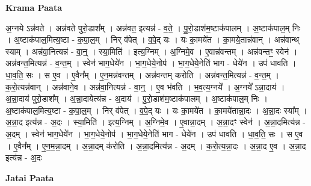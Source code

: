 \documentclass[17pt]{extarticle}
\begin{document}
\textbf{Krama Paata} \newline

अ॒ग्नये ऽन्न॑वते । अन्न॑वते पुरो॒डाश᳚म् । अन्न॑वत॒ इत्यन्न॑ - व॒ते॒ । पु॒रो॒डाश॑म॒ष्टाक॑पालम् । अ॒ष्टाक॑पाल॒म् निः । अ॒ष्टाक॑पाल॒मित्य॒ष्टा - क॒पा॒ल॒म् । निर् व॑पेत् । व॒पे॒द् यः । यः का॒मये॑त । का॒मये॒तान्न॑वान् । अन्न॑वान्थ् स्याम् । अन्न॑वा॒नित्यन्न॑ - वा॒न्॒ । स्या॒मिति॑ । इत्य॒ग्निम् । अ॒ग्निमे॒व । ए॒वान्न॑वन्तम् । अन्न॑वन्तꣳ॒॒ स्वेन॑ । अन्न॑वन्त॒मित्यन्न॑ - व॒न्त॒म् । स्वेन॑ भाग॒धेये॑न । भा॒ग॒धेये॒नोप॑ । भा॒ग॒धेये॒नेति॑ भाग - धेये॑न । उप॑ धावति । धा॒व॒ति॒ सः । स ए॒व । ए॒वैन᳚म् । ए॒न॒मन्न॑वन्तम् । अन्न॑वन्तम् करोति । अन्न॑वन्त॒मित्यन्न॑ - व॒न्त॒म् । क॒रो॒त्यन्न॑वान् । अन्न॑वाने॒व । अन्न॑वा॒नित्यन्न॑ - वा॒न्॒ । ए॒व भ॑वति । भ॒व॒त्य॒ग्नये᳚ । अ॒ग्नये᳚ ऽन्ना॒दाय॑ । अ॒न्ना॒दाय॑ पुरो॒डाश᳚म् । अ॒न्ना॒दायेत्य॑न्न - अ॒दाय॑ । पु॒रो॒डाश॑म॒ष्टाक॑पालम् । अ॒ष्टाक॑पाल॒म् निः । अ॒ष्टाक॑पाल॒मित्य॒ष्टा - क॒पा॒ल॒म् । निर् व॑पेत् । व॒पे॒द् यः । यः का॒मये॑त । का॒मये॑तान्ना॒दः । अ॒न्ना॒दः स्या᳚म् । अ॒न्ना॒द इत्य॑न्न - अ॒दः । स्या॒मिति॑ । इत्य॒ग्निम् । अ॒ग्निमे॒व । ए॒वान्ना॒दम् । अ॒न्ना॒दꣳ स्वेन॑ । अ॒न्ना॒दमित्य॑न्न - अ॒दम् । स्वेन॑ भाग॒धेये॑न । भा॒ग॒धेये॒नोप॑ । भा॒ग॒धेये॒नेति॑ भाग - धेये॑न । उप॑ धावति । धा॒व॒ति॒ सः । स ए॒व । ए॒वैन᳚म् । ए॒न॒म॒न्ना॒दम् । अ॒न्ना॒दम् क॑रोति । अ॒न्ना॒दमित्य॑न्न - अ॒दम् । क॒रो॒त्य॒न्ना॒दः । अ॒न्ना॒द ए॒व । अ॒न्ना॒द इत्य॑न्न - अ॒दः \newline

\textbf{Jatai Paata} \newline
\end{document}
